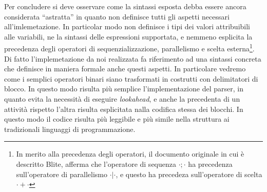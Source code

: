 Per concludere si deve osservare come la sintassi esposta debba essere ancora
considerata ``astratta'' in quanto non definisce tutti gli aspetti necessari
all'imlemetazione. In particolar modo non definisce i tipi dei valori
attribuibili alle variabili, ne la sintassi delle espressioni supportata, e
nemmeno esplicita la precedenza degli operatori di sequenzializzazione,
parallelismo e scelta esterna\footnote{In merito alla precedenza degli
operatori, il documento originale in cui è descritto Blite, afferma che
l'operatore di sequenza $\cdot ; \cdot$ ha precedenza
sull'operatore di parallelismo $\cdot | \cdot$, e questo ha precedeza
sull'operatore di scelta $\cdot + \cdot$}. Di fatto l'implemetazione da noi
realizzata fa riferimento ad una sintassi concreta che definisce in maniera
formale anche questi aspetti. In particolare vedremo come  i semplici
operatori binari siano trasformati in costrutti con 
delimitatori di blocco. In questo modo risulta più semplice
l'implementazione del parser, in quanto evita la necessità di eseguire
\emph{lookahead}, e anche la precedenta di un attività rispetto l'altra risulta
esplicitata nalla codifica stessa dei blocchi. In questo modo il codice risulta
più leggibile e più simile nella struttura ai tradizionali linguaggi di
programmazione.
